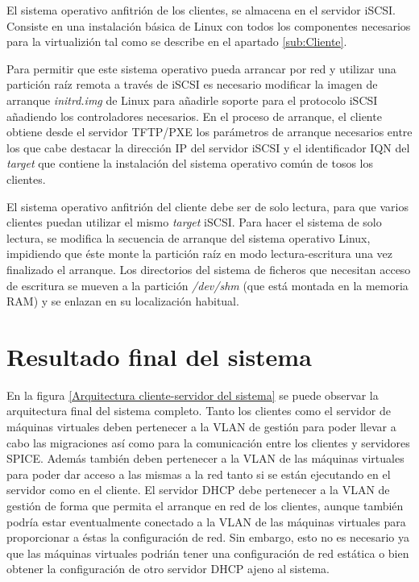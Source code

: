 \documentclass[spanisheDIVcalc,twoside,parskip-,pointlessnumbers,final]{scrbook}
\begin{document}
El sistema operativo anfitrión de los clientes, se almacena en el
servidor iSCSI. Consiste en una instalación básica de Linux con todos
los componentes necesarios para la virtualizión tal como se describe
en el apartado \ref{sub:Cliente}.

Para permitir que este sistema operativo pueda arrancar por red y
utilizar una partición raíz remota a través de iSCSI es necesario
modificar la imagen de arranque \emph{initrd.img} de Linux para añadirle
soporte para el protocolo iSCSI añadiendo los controladores necesarios.
En el proceso de arranque, el cliente obtiene desde el servidor TFTP/PXE
los parámetros de arranque necesarios entre los que cabe destacar
la dirección IP del servidor iSCSI y el identificador IQN del \emph{target}
que contiene la instalación del sistema operativo común de tosos
los clientes.

El sistema operativo anfitrión del cliente debe ser de solo lectura,
para que varios clientes puedan utilizar el mismo \emph{target} iSCSI.
Para hacer el sistema de solo lectura, se modifica la secuencia de
arranque del sistema operativo Linux, impidiendo que éste monte la
partición raíz en modo lectura-escritura una vez finalizado el arranque.
Los directorios del sistema de ficheros que necesitan acceso de escritura
se mueven a la partición \emph{/dev/shm} (que está montada en la memoria
RAM) y se enlazan en su localización habitual.


\section{Resultado final del sistema}

En la figura \ref{Arquitectura cliente-servidor del sistema} se puede
observar la arquitectura final del sistema completo. Tanto los clientes
como el servidor de máquinas virtuales deben pertenecer a la VLAN
de gestión para poder llevar a cabo las migraciones así como para
la comunicación entre los clientes y servidores SPICE. Además también
deben pertenecer a la VLAN de las máquinas virtuales para poder dar
acceso a las mismas a la red tanto si se están ejecutando en el servidor
como en el cliente. El servidor DHCP debe pertenecer a la VLAN de
gestión de forma que permita el arranque en red de los clientes, aunque
también podría estar eventualmente conectado a la VLAN de las máquinas
virtuales para proporcionar a éstas la configuración de red. Sin embargo,
esto no es necesario ya que las máquinas virtuales podrián tener una
configuración de red estática o bien obtener la configuración de otro
servidor DHCP ajeno al sistema.
\end{document}
